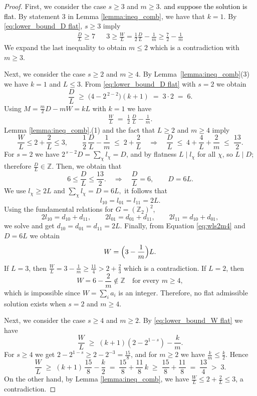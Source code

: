 \documentclass[12pt,twoside,]{amsart}
\theoremstyle{plain}
\theoremstyle{definition}
\begin{document}
\begin{proof}
First, we consider the case $s \geq 3$ and $m \geq 3$. 
\textcolor{black}{and suppose the solution is flat.} By statement 3 in Lemma \ref{lemma:ineq_comb}, we have that $k=1$. 
By \eqref{eq:lower_bound_D flat}, $s\geq 3$ imply
\begin{align*}
\frac{D}{L} \geq 7
&&
3 \geq  \frac{W}{L} = \frac{1}{2}\frac{D}{L} - \frac{1}{m}  
\geq
 \frac{7}{2} - \frac{1}{m}
\end{align*}
We expand the last inequality to obtain $m \leq 2$ which is a contradiction with $m \geq 3$. 


Next, we consider the case $s \geq 2$ and $m \geq 4$. By Lemma~\ref{lemma:ineq_comb}(3) we have
$k=1 $  and $L\le 3.$ From \eqref{eq:lower_bound_D flat} with $s=2$ we obtain
\[
\frac{D}{L}\;\ge\;\bigl(4-2^{\,2-2}\bigr)(k+1)\;=\;3\cdot 2\;=\;6.
\]
Using $M=\frac{m}{2}D-mW=kL$ with $k=1$ we have
\begin{align}
\frac{W}{L}\;=\;\frac12\,\frac{D}{L}-\frac{1}{m}.
\label{eq:wls2m4}
\end{align}
Lemma \ref{lemma:ineq_comb}.(1) and the fact that $L\ge 2$ and $m\ge 4$ imply
\[
\frac{W}{L}\le 2+\frac{2}{L}\le 3, 
\quad
\quad 
\frac12\,\frac{D}{L}-\frac{1}{m}\;\le\;2+\frac{2}{L}
\quad\Longrightarrow\quad
\frac{D}{L}\;\le\;4+\frac{4}{L}+\frac{2}{m}\;\le\;\frac{13}{2}.
\]
For $s=2$ we have $2^{\,s-2}D=\sum_{\chi}l_\chi=D$, and by flatness $L\mid l_\chi$ for all $\chi$, so $L\mid D$; therefore $\frac{D}{L}\in\mathbb Z$. 
Then, we obtain that
\[
6 \leq 
\frac{D}{L}  \le \frac{13}{2}.
\quad\Longrightarrow\quad
\frac{D}{L}=6,\qquad D=6L.
\]
We use  $l_\chi\ge 2L$  and
\( 
\sum_{\chi}l_\chi=D=6L,
\)
it follows that
\[
l_{10}=l_{01}=l_{11}=2L.
\]
Using the fundamental relations for $G=(\mathbb Z_2)^2$,
\[
2l_{10}=d_{10}+d_{11},\qquad
2l_{01}=d_{01}+d_{11},\qquad
2l_{11}=d_{10}+d_{01},
\]
we solve and get \( d_{10}=d_{01}=d_{11}=2L.\) Finally, from 
Equation \eqref{eq:wls2m4} and $D=6L$ we obtain
\[
W=\Bigl(3-\frac{1}{m}\Bigr)L.
\]
If $L=3$, then $\frac{W}{L}=3-\frac{1}{m}\ge \frac{11}{4}>2+\frac{2}{3}$ which is a contradiction. If $L=2$, then
\[
W=6-\frac{2}{m}\notin\mathbb Z\quad\text{for every }m\ge 4,
\]
which is impossible since $W=\sum_i a_i$ is an integer. Therefore, no flat admissible solution exists when $s=2$ and $m\ge 4$.

Next, we consider the case $s\geq 4$ and $m\geq 2$. By \eqref{eq:lower_bound_W flat} we have
\[
\frac{W}{L}\;\geq\; (k+1)\!\left(2-2^{1-s}\right)-\frac{k}{m}.
\]
For $s\geq 4$ we get $2-2^{1-s}\geq 2-2^{-3}=\tfrac{15}{8}$, and for $m\geq 2$ we have $\tfrac{k}{m}\leq \tfrac{k}{2}$. Hence
\[
\frac{W}{L}\;\geq\; (k+1)\,\frac{15}{8}-\frac{k}{2}
\;=\;\frac{15}{8}+\frac{11}{8}\,k
\;\geq\;\frac{15}{8}+\frac{11}{8}
\;=\;\frac{13}{4}
\;>\;3.
\]
On the other hand, by Lemma \ref{lemma:ineq_comb}, we have $\frac{W}{L}\leq 2+\frac{2}{L}\leq 3$, a contradiction. 



\end{proof}
\end{document}
